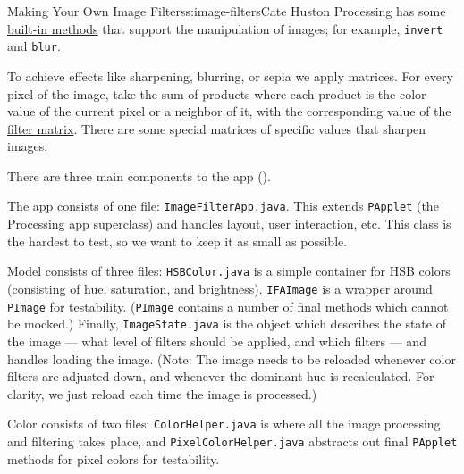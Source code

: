 \begin{aosachapter}{Making Your Own Image Filters}{s:image-filters}{Cate Huston}
Processing has some
\href{https://www.processing.org/reference/filter_.html}{built-in
methods} that support the manipulation of images; for example,
\texttt{invert} and \texttt{blur}.

To achieve effects like sharpening, blurring, or sepia we apply
matrices. For every pixel of the image, take the sum of products where
each product is the color value of the current pixel or a neighbor of
it, with the corresponding value of the
\href{http://lodev.org/cgtutor/filtering.html}{filter matrix}. There are
some special matrices of specific values that sharpen images.

\label{architecture}

There are three main components to the app
().

\label{the-app-1}

The app consists of one file: \texttt{ImageFilterApp.java}. This extends
\texttt{PApplet} (the Processing app superclass) and handles layout,
user interaction, etc. This class is the hardest to test, so we want to
keep it as small as possible.

\label{model}

Model consists of three files: \texttt{HSBColor.java} is a simple
container for HSB colors (consisting of hue, saturation, and
brightness). \texttt{IFAImage} is a wrapper around \texttt{PImage} for
testability. (\texttt{PImage} contains a number of final methods which
cannot be mocked.) Finally, \texttt{ImageState.java} is the object which
describes the state of the image --- what level of filters should be
applied, and which filters --- and handles loading the image. (Note: The
image needs to be reloaded whenever color filters are adjusted down, and
whenever the dominant hue is recalculated. For clarity, we just reload
each time the image is processed.)

\label{color-1}

Color consists of two files: \texttt{ColorHelper.java} is where all the
image processing and filtering takes place, and
\texttt{PixelColorHelper.java} abstracts out final \texttt{PApplet}
methods for pixel colors for testability.


\label{wrapper-classes-and-tests}


\end{aosachapter}
